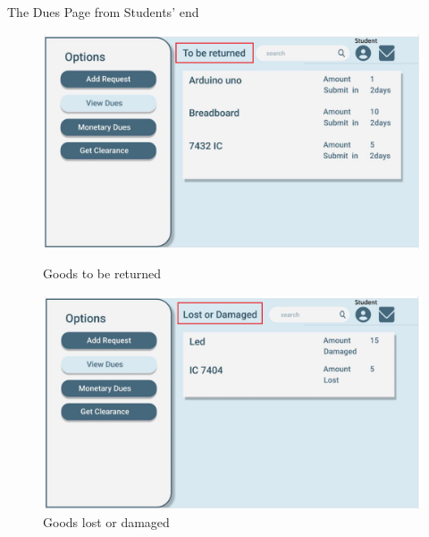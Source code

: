 \documentclass[20pt]{beamer}
\numberwithin{figure}{section}
\begin{document}
\begin{frame}{The Dues Page from Students' end}
    \begin{figure}

        \centering

        \begin{minipage}[b]{0.45\textwidth}
            \centering
            \includegraphics[width= \textwidth , height= 0.2\paperheight]{ViewDuesUI2.png}
            \caption{Goods to be returned}
            \label{fig:56}
        \end{minipage}
        \begin{minipage}[b]{0.45\textwidth}
            \centering
            \includegraphics[width= \textwidth , height= 0.2\paperheight]{ViewDuesUI3.png}
            \caption{Goods lost or damaged}
            \label{fig:57}

        \end{minipage}
        
    \end{figure}

\end{frame}
\end{document}
